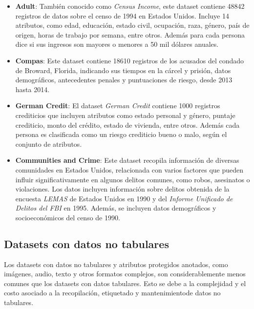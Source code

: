    \begin{itemize}
        \item \textbf{Adult}: Tambi\'en conocido como \textit{Census Income}, este dataset contiene 48842 registros de 
        datos sobre el censo de 1994 en Estados Unidos. Incluye 14 atributos, como edad, educaci\'on, estado civil,
        ocupaci\'on, raza, g\'enero, pa\'is de origen, horas de trabajo por semana, entre otros. Adem\'as para cada 
        persona dice si sus ingresos son mayores o menores a 50 mil d\'olares anuales.
        \item \textbf{Compas}: Este dataset contiene 18610 registros de los acusados del condado de Broward, Florida,
        indicando sus tiempos en la c\'arcel y prisi\'on, datos demogr\'aficos, antecedentes penales y puntuaciones 
        de riesgo, desde 2013 hasta 2014.
        \item \textbf{German Credit}: El dataset \textit{German Credit} contiene 1000 registros crediticios que incluyen atributos 
        como estado personal y g\'enero, puntaje crediticio, monto del cr\'edito, estado de vivienda, entre otros. Adem\'as cada 
        persona es clasificada como un riesgo crediticio bueno o malo, seg\'un el conjunto de atributos.
        \item \textbf{Communities and Crime}: Este dataset recopila informaci\'on de diversas comunidades en Estados Unidos, 
        relacionada con varios factores que pueden influir significativamente en algunos delitos comunes, como robos, asesinatos o 
        violaciones. Los datos incluyen informaci\'on sobre delitos obtenida de la encuesta \textit{LEMAS} de Estados Unidos en 1990 y 
        del \textit{Informe Unificado de Delitos del FBI} en 1995. Adem\'as, se incluyen datos demogr\'aficos y socioecon\'omicos del 
        censo de 1990.

    \end{itemize}

    \subsection{Datasets con datos no tabulares}
    Los datasets con datos no tabulares y atributos protegidos anotados, como im\'agenes, audio, texto y otros formatos complejos, 
    son considerablemente menos comunes que los datasets con datos tabulares. Esto se debe a la complejidad y el costo asociado a la 
    recopilaci\'on, etiquetado y mantenimientode datos no tabulares.


